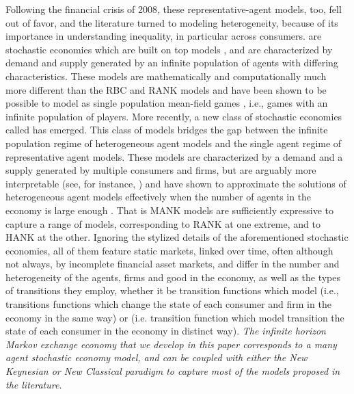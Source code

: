 Following the financial crisis of 2008, these representative-agent models, too, fell out of favor, and the literature turned to modeling heterogeneity, because of its importance in understanding inequality, in particular across consumers.
 are stochastic economies which 
are built on top  models \cite{bewley1983difficulty, huggett1993risk,aiyagari1994uninsured}, and are characterized by demand and supply generated by an infinite population of agents with differing characteristics. These models are mathematically and computationally much more different than the RBC and RANK models and have been shown to be possible to model as single population mean-field games \cite{achdou2022income}, i.e., games with an infinite population of players. 
More recently, a new class of stochastic economies called  has emerged. This class of models bridges the gap between the infinite population regime of heterogeneous agent models and the single agent regime of representative agent models. These models are characterized by a demand and a supply generated by multiple consumers and firms, but are arguably more interpretable \cite{eskelinen2021monetary} (see, for instance, \citet{cloyne2020monetary, eskelinen2021monetary}) and have shown to approximate the solutions of heterogeneous agent models effectively when the number of agents in the economy is large enough \cite{han2021deepham}.
That is MANK models are sufficiently expressive to capture a range of models, corresponding to RANK at one extreme, and to HANK at the other.
Ignoring the stylized details of the aforementioned stochastic economies, all of them feature static markets, linked over time, often although not always, by incomplete financial asset markets, and differ in the number and heterogeneity of the agents, firms and good in the economy, as well as the types of transitions they employ, whether it be transition functions which model  (i.e., transitions functions which change the state of each consumer and firm in the economy in the same way)  or  (i.e. transition function which model transition the state of each consumer in the economy in distinct way).
\emph{The infinite horizon Markov exchange economy that we develop in this paper corresponds to a many agent stochastic economy model, and can be coupled with either the New Keynesian or New Classical paradigm to capture most of the models proposed in the literature.}


